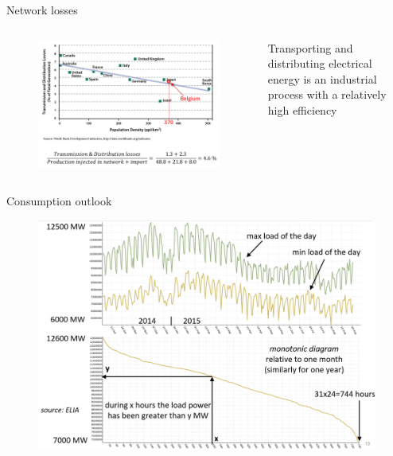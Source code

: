 \begin{frame}{Network losses}

\begin{columns}
    \begin{column}{0.55\textwidth}
      \begin{figure}
      \centering
      \includegraphics[width=\linewidth]{images/network_losses_world.png}
      \end{figure}
    \end{column}
    \begin{column}{0.45\textwidth}
      Transporting and distributing electrical energy is an industrial process with a relatively high efficiency
    \end{column}
\end{columns}
\end{frame}

\begin{frame}
{Consumption outlook}
\begin{figure}
\centering
\includegraphics[width=0.6\linewidth]{images/consumption_be.png}
\end{figure}
\end{frame}

